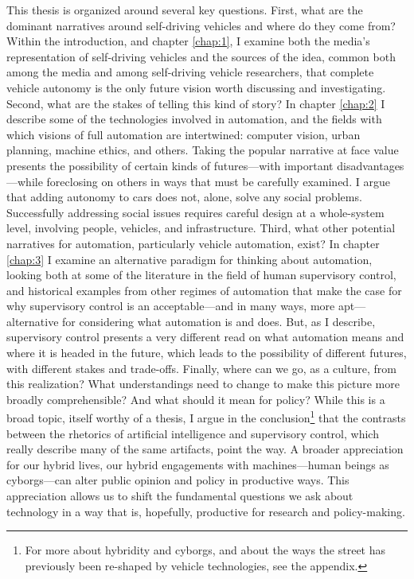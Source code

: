 This thesis is organized around several key questions. First, what are
the dominant narratives around self-driving vehicles and where do they
come from? Within the introduction, and chapter \ref{chap:1}, I
examine both the media's representation of self-driving vehicles and
the sources of the idea, common both among the media and among
self-driving vehicle researchers, that complete vehicle autonomy is
the only future vision worth discussing and investigating. Second,
what are the stakes of telling this kind of story? In chapter
\ref{chap:2} I describe some of the technologies involved in
automation, and the fields with which visions of full automation are
intertwined: computer vision, urban planning, machine ethics, and
others. Taking the popular narrative at face value presents the
possibility of certain kinds of futures---with important
disadvantages---while foreclosing on others in ways that must be
carefully examined. I argue that adding autonomy to cars does not,
alone, solve any social problems. Successfully addressing social
issues requires careful design at a whole-system level, involving
people, vehicles, and infrastructure. Third, what other potential
narratives for automation,
particularly vehicle automation, exist? In chapter \ref{chap:3} I
examine an alternative paradigm for thinking about automation, looking
both at some of the literature in the field of human supervisory
control, and historical examples from other regimes of automation that
make the case for why supervisory control is an acceptable---and in
many ways, more apt---alternative for considering what automation is
and does. But, as I describe, supervisory control presents a very
different read on what automation means and where it is headed in the
future, which leads to the possibility of different futures, with
different stakes and trade-offs. Finally, where can we go, as a
culture, from this realization? What understandings need to change to
make this picture more broadly comprehensible? And what should it mean
for policy? While this is a broad topic, itself worthy of a thesis, I
argue in the conclusion\footnote{For more about hybridity and cyborgs,
and about the ways the street has previously been re-shaped by vehicle
technologies, see the appendix.} that the contrasts
between the rhetorics of artificial intelligence and supervisory
control, which really describe many of the same artifacts, point the
way. A broader appreciation for our hybrid lives, our hybrid
engagements with machines---human beings as cyborgs---can alter public
opinion and policy in
productive ways. This appreciation allows us to shift the fundamental
questions we ask about technology in a way that is, hopefully,
productive for research and policy-making.

